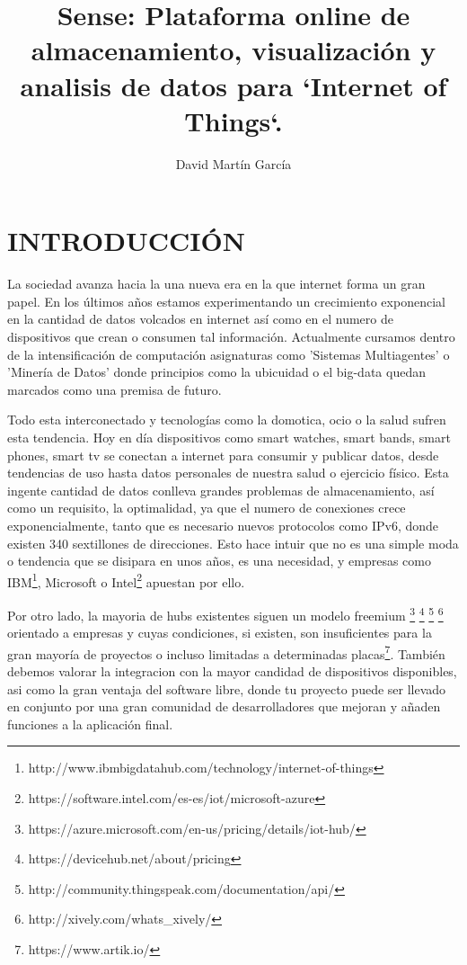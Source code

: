 \documentclass{pre-tfg}
\title{Sense: Plataforma online de almacenamiento, visualización y analisis
  de datos para `Internet of Things`.}
\author{David Martín García}
\begin{document}
\maketitle
\tableofcontents

\newpage

\section{INTRODUCCIÓN}

La sociedad avanza hacia la una nueva era en la que internet forma un
gran papel. En los últimos años estamos experimentando un crecimiento exponencial en la cantidad de datos volcados en internet así como en el numero de dispositivos que crean o consumen tal información. Actualmente cursamos dentro de la intensificación de computación asignaturas como 'Sistemas Multiagentes' o 'Minería de Datos' donde principios como la ubicuidad o el big-data quedan marcados como una premisa de futuro.

Todo esta interconectado y tecnologías como la domotica, ocio o la
salud sufren esta tendencia. Hoy en día dispositivos como smart
watches, smart bands, smart phones, smart tv se conectan a internet
para consumir y publicar datos, desde tendencias de uso hasta datos
personales de nuestra salud o ejercicio físico. Esta ingente cantidad
de datos conlleva grandes problemas de almacenamiento, así como un
requisito, la optimalidad, ya que el numero de conexiones crece
exponencialmente, tanto que es necesario nuevos protocolos como IPv6,
donde existen 340 sextillones de direcciones. Esto hace intuir que no
es una simple moda o tendencia que se disipara en unos años, es una
necesidad, y empresas como
IBM\footnote{http://www.ibmbigdatahub.com/technology/internet-of-things},
Microsoft o
Intel\footnote{https://software.intel.com/es-es/iot/microsoft-azure}
apuestan por ello.

Por otro lado, la mayoria de hubs existentes siguen un modelo
freemium
\footnote{https://azure.microsoft.com/en-us/pricing/details/iot-hub/}
\footnote{https://devicehub.net/about/pricing}
\footnote{http://community.thingspeak.com/documentation/api/}
\footnote{http://xively.com/whats\_xively/}
orientado a empresas y cuyas condiciones, si existen, son
insuficientes para la gran mayoría de proyectos o incluso limitadas a
determinadas placas\footnote{https://www.artik.io/}. También debemos
valorar la integracion con la mayor candidad de dispositivos
disponibles, asi como la gran ventaja del software libre, donde tu proyecto puede ser llevado en conjunto por una gran
comunidad de desarrolladores que mejoran y añaden funciones a la
aplicación final.
\end{document}
